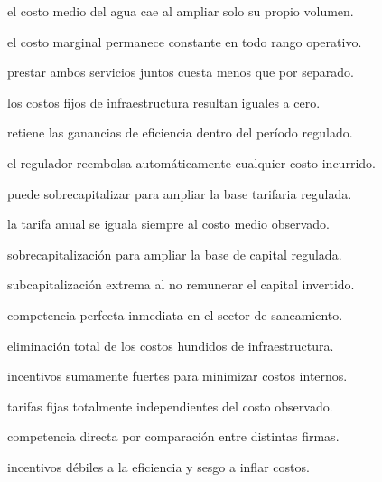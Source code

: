 \begin{opts}
    \item el costo medio del agua cae al ampliar solo su propio volumen.
    \item el costo marginal permanece constante en todo rango operativo.
    \item prestar ambos servicios juntos cuesta menos que por separado.
    \item los costos fijos de infraestructura resultan iguales a cero.
\end{opts}

\begin{opts}
    \item retiene las ganancias de eficiencia dentro del período regulado.
    \item el regulador reembolsa automáticamente cualquier costo incurrido.
    \item puede sobrecapitalizar para ampliar la base tarifaria regulada.
    \item la tarifa anual se iguala siempre al costo medio observado.
\end{opts}

\begin{opts}
    \item sobrecapitalización para ampliar la base de capital regulada.
    \item subcapitalización extrema al no remunerar el capital invertido.
    \item competencia perfecta inmediata en el sector de saneamiento.
    \item eliminación total de los costos hundidos de infraestructura.
\end{opts}

\begin{opts}
    \item incentivos sumamente fuertes para minimizar costos internos.
    \item tarifas fijas totalmente independientes del costo observado.
    \item competencia directa por comparación entre distintas firmas.
    \item incentivos débiles a la eficiencia y sesgo a inflar costos.
\end{opts}

